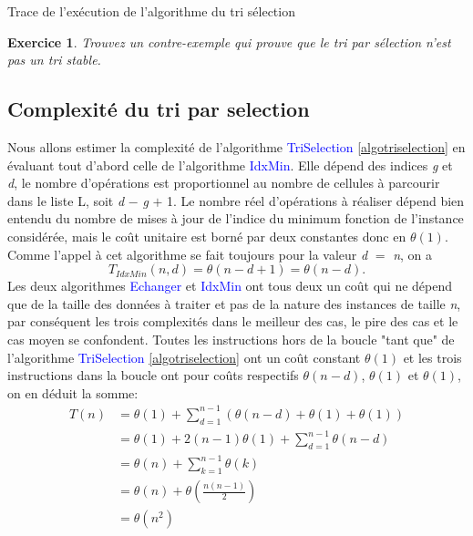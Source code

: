 \documentclass[a4paper,10pt]{article}
\newtheorem{exo}{Exercice}
\begin{document}
\begin{center}
    Trace de l'exécution de l'algorithme du tri sélection
\end{center}

\begin{exo}
    Trouvez un contre-exemple qui prouve que le tri par sélection n'est pas un tri stable.
\end{exo}

\subsection{Complexité du tri par selection}
Nous allons estimer la complexité de l'algorithme \textcolor{blue}{TriSelection} \ref{algotriselection} 
en évaluant tout d'abord celle de l'al­gor­i­thme \textcolor{blue}{IdxMin}. Elle dépend des indices {\itshape g} et {\itshape d},
le nombre d'opérations est pro­por­tion­nel au nombre de cellules à parcourir dans le liste L, soit 
{\itshape d} $-$ {\itshape g} $+$ 1. Le nombre réel d'opérations à réaliser dépend bien entendu du nombre 
de mises à jour de l'indice du minimum fonction de l'instance considérée, mais le coût unitaire est borné par 
deux constantes donc en $\theta(1)$. Comme l'appel à cet al­go­ri­thme se fait toujours pour la valeur
{\itshape d} $=$ {\itshape n}, on a \[ T_{IdxMin}(n,d) = \theta(n - d + 1) = \theta(n - d). \]
Les deux algorithmes \textcolor{blue}{Echanger} et \textcolor{blue}{IdxMin} ont tous deux un coût qui ne 
dépend que de la taille des don­nées à traiter et pas de la nature des instances de taille {\itshape n},
par conséquent les trois complexités dans le meilleur des cas, le pire des cas et le cas moyen se confondent.
Toutes les instructions hors de la boucle "tant que" de l'algorithme \textcolor{blue}{TriSelection} \ref{algotriselection} 
ont un coût constant $\theta(1)$ et les trois instructions dans la boucle ont pour coûts respectifs
$\theta(n - d)$, $\theta(1)$ et $\theta(1)$, on en déduit la somme:
\begin{align*}
    T(n) & = \theta(1) + \sum_{d=1}^{n-1}(\theta(n - d) + \theta(1) + \theta(1)) \\
         & = \theta(1) + 2(n - 1)\theta(1) + \sum_{d=1}^{n-1}\theta(n - d) \\
         & = \theta(n) + \sum_{k=1}^{n-1}\theta(k) \\
         & = \theta(n) + \theta(\frac{n(n - 1)}{2}) \\
         & = \theta(n^2)
\end{align*}
\end{document}

